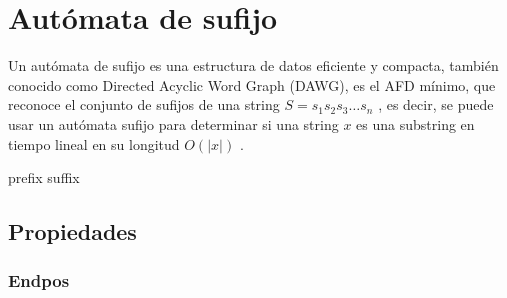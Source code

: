 \section{Autómata de sufijo}\label{SuffixAutomaton}
Un autómata de sufijo es una estructura de datos eficiente y compacta, también conocido como Directed Acyclic Word Graph (DAWG), es el \acrshort{AFD} mínimo, que reconoce el conjunto de sufijos de una \gls{string} $S  = s_1 s_2 s_3 \dots s_n $ \cite{wiki:Suffix_automaton}, es decir, se puede usar un autómata sufijo para determinar si una \gls{string} $x$ es una \gls{substring} en tiempo lineal en su longitud $O(| x |)$ \cite{article:10.1016/j.tcs.2009.03.034}.


\gls{prefix}
\gls{suffix}

\subsection{Propiedades}

\subsubsection{Endpos}


